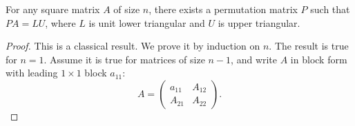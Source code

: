 \documentclass[10pt,twoside]{siamart1116}
\numberwithin{theorem}{section}
\begin{document}
\begin{theorem}\label{thm:row_permutation}
  For any square matrix $A$ of size $n$, there exists a permutation matrix $P$ such that $PA = LU$, where $L$ is unit lower triangular and $U$ is upper triangular.
\end{theorem}

\begin{proof}
  This is a classical result. We prove it by induction on $n$. The result is true for $n=1$. Assume it is true for matrices of size $n-1$, and write $A$ in block form with leading $1 \times 1$ block $a_{11}$:
  \[
    A =
    \begin{pmatrix}
      a_{11} & A_{12} \\
      A_{21} & A_{22}
    \end{pmatrix}.
  \]


\end{proof}
\end{document}
